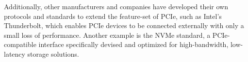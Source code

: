 Additionally, other manufacturers and companies have developed their own protocols and standards to extend the feature-set of PCIe, such as Intel's Thunderbolt, which enables PCIe devices to be connected externally with only a small loss of performance. \cite{intel_what_nodate-1} Another example is the NVMe standard, a PCIe-compatible interface specifically devised and optimized for high-bandwidth, low-latency storage solutions. \cite{kingston_understanding_nodate}





